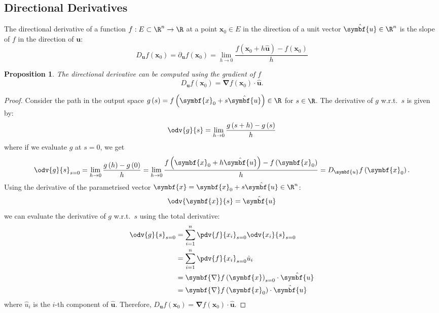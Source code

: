 \documentclass{article}
\newtheorem{proposition}{Proposition}[subsection]
\begin{document}
\subsection{Directional Derivatives}
The directional derivative of a function \(f : E \subset \R^n \to \R\)
at a point \(\symbf{x}_0 \in E\) in the direction of a unit vector
\(\hat{\symbf{u}} \in \R^n\) is the slope of \(f\) in the direction of
\(\symbf{u}\):
\begin{equation*}
    D_{\symbf{u}} f\left( \symbf{x}_0 \right) = \partial_{\symbf{u}} f\left( \symbf{x}_0 \right) = \lim_{h \to 0}
     \frac{f\left( \symbf{x}_0 + h \hat{\symbf{u}} \right) - f\left(
     \symbf{x}_0 \right)}{h}
\end{equation*}
\begin{proposition}
    The directional derivative can be computed using the gradient of \(f\)
    \begin{equation*}
        D_{\symbf{u}} f\left( \symbf{x}_0 \right) = \symbf{\nabla} f\left( \symbf{x}_0 \right) \cdot \hat{\symbf{u}}.
    \end{equation*}
\end{proposition}
\begin{proof}
    Consider the path in the output space \(g\left( s \right) = f\left( \symbf{x}_0 + s \hat{\symbf{u}} \right) \in \R\) for \(s \in \R\).
    The derivative of \(g\) w.r.t.\ \(s\) is given by:
    \begin{equation*}
        \odv{g}{s} = \lim_{h \to 0} \frac{g\left( s + h \right) - g\left( s \right)}{h}
    \end{equation*}
    where if we evaluate \(g\) at \(s = 0\), we get
    \begin{equation*}
        \odv{g}{s}_{s = 0} = \lim_{h \to 0} \frac{g\left( h \right) - g\left( 0 \right)}{h} = \lim_{h \to 0} \frac{f\left( \symbf{x}_0 + h \hat{\symbf{u}} \right) - f\left( \symbf{x}_0 \right)}{h} = D_{\symbf{u}} f\left( \symbf{x}_0 \right).
    \end{equation*}
    Using the derivative of the parametrised vector \(\symbf{x} = \symbf{x}_0 + s \hat{\symbf{u}} \in \R^n\):
    \begin{equation*}
        \odv{\symbf{x}}{s} = \hat{\symbf{u}}
    \end{equation*}
    we can evaluate the derivative of \(g\) w.r.t.\ \(s\) using the total derivative:
    \begin{align*}
        \odv{g}{s}_{s = 0} & = \sum_{i = 1}^n \pdv{f}{x_i}_{s = 0} \odv{x_i}{s}_{s = 0}               \\
                           & = \sum_{i = 1}^n \pdv{f}{x_i}_{s = 0} \hat{u}_i                          \\
                           & = \symbf{\nabla} f\left( \symbf{x} \right)_{s = 0} \cdot \hat{\symbf{u}} \\
                           & = \symbf{\nabla} f\left( \symbf{x}_0 \right) \cdot \hat{\symbf{u}}
    \end{align*}
    where \(\hat{u}_i\) is the \(i\)-th component of \(\hat{\symbf{u}}\).
    Therefore, \(D_{\symbf{u}} f\left( \symbf{x}_0 \right) = \symbf{\nabla} f\left( \symbf{x}_0 \right) \cdot \hat{\symbf{u}}\).
\end{proof}
\end{document}

